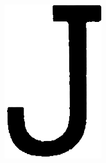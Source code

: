 \documentclass[a4paper,12pt,notitlepage]{article}
\begin{document}
			\begin{figure}[H]
				\centering
				\begin{subfigure}[b]{0.14\textwidth}
					\centering
					\includegraphics[width=\textwidth]{chris/image23}
					\caption{}
				\end{subfigure}
				\begin{subfigure}[b]{0.15\textwidth}
					\centering

\end{subfigure}
\end{figure}
\end{document}
